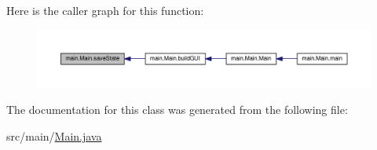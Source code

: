 Here is the caller graph for this function\+:
\nopagebreak
\begin{figure}[H]
\begin{center}
\leavevmode
\includegraphics[width=350pt]{classmain_1_1_main_af4c27d7b3cbc7694e4af163c998f76be_icgraph}
\end{center}
\end{figure}




The documentation for this class was generated from the following file\+:\begin{DoxyCompactItemize}
\item 
src/main/\hyperlink{_main_8java}{Main.\+java}\end{DoxyCompactItemize}

